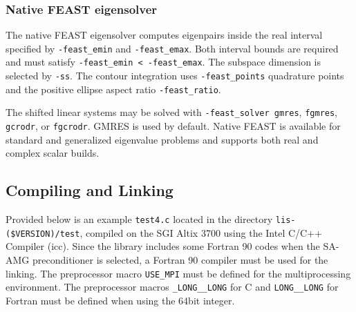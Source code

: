 \documentclass[a4paper]{article}
\begin{document}
\subsubsection{Native FEAST eigensolver}
The native FEAST eigensolver computes eigenpairs inside the real interval
specified by \verb|-feast_emin| and \verb|-feast_emax|.  Both interval
bounds are required and must satisfy
\verb|-feast_emin < -feast_emax|.  The subspace dimension is selected by
\verb|-ss|.  The contour integration uses
\verb|-feast_points| quadrature points and the positive ellipse aspect
ratio \verb|-feast_ratio|.

The shifted linear systems may be solved with
\verb|-feast_solver gmres|, \verb|fgmres|, \verb|gcrodr|, or
\verb|fgcrodr|.  GMRES is used by default.  Native FEAST is available
for standard and generalized eigenvalue problems and supports both real
and complex scalar builds.

\newpage
\subsection{Compiling and Linking}
Provided below is an example {\tt test4.c} located in
the directory \verb|lis-($VERSION)/test|, 
compiled on the SGI Altix 3700 using the Intel C/C++ Compiler (icc). 
Since the library includes some Fortran 90 codes 
when the SA-AMG preconditioner is selected, 
a Fortran 90 compiler must be used for the linking. 
The preprocessor macro \verb|USE_MPI| must be defined for the
multiprocessing environment. 
The preprocessor macros {\tt \_LONG\_\_LONG} for C and {\tt LONG\_\_LONG} 
for Fortran must be defined when using the 64bit integer.
\end{document}
